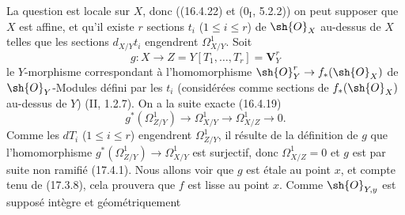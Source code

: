 La question est locale sur $X$, donc ((16.4.22) et ($0_{\mathrm I}$, 5.2.2)) on peut supposer que $X$ est affine, et qu'il existe $r$ sections $t_i$ ($1\leq i\leq r$) de $\sh{O}_X$ au-dessus de $X$ telles que les sections $d_{X/Y}t_i$ engendrent $\Omega^1_{X/Y}$. Soit
\[
  g:X\to Z=Y[T_1,\ldots,T_r]=\mathbf V^r_Y
\]
le $Y$-morphisme correspondant à l'homomorphisme $\sh{O}_Y^r\to f_*(\sh{O}_X)$ de $\sh{O}_Y$-Modules défini par les $t_i$ (considérées comme sections de $f_*(\sh{O}_X)$ au-dessus de $Y$) (II, 1.2.7). On a la suite exacte (16.4.19)
\[
  g^*(\Omega^1_{Z/Y})\longrightarrow\Omega^1_{X/Y}\longrightarrow\Omega^1_{X/Z}\longrightarrow0.
\]
Comme les $dT_i$ ($1\leq i\leq r$) engendrent $\Omega^1_{Z/Y}$, il résulte de la définition de $g$ que l'homomorphisme $g^*(\Omega^1_{Z/Y})\to\Omega^1_{X/Y}$ est surjectif, donc $\Omega^1_{X/Z}=0$ et $g$ est par suite non ramifié (17.4.1). Nous allons voir que $g$ est étale au point $x$, et compte tenu de (17.3.8), cela prouvera que $f$ est lisse au point $x$. Comme $\sh{O}_{Y,y}$ est supposé intègre et géométriquement

